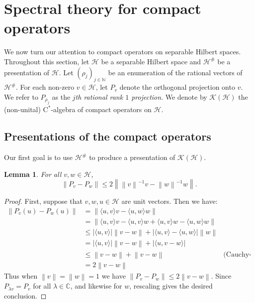 \documentclass{amsart}
\newcommand{\norm}[1]{\left\| #1 \right\|}
\newcommand{\abs}[1]{\left\vert #1 \right\vert}
\newcommand{\cstar}{$\mathrm{C}^*$}
\theoremstyle{plain}
\newtheorem{lemma}[theorem]{Lemma}
\theoremstyle{definition}
\numberwithin{equation}{section}
\begin{document}
\section{Spectral theory for compact operators}\label{section:CompactOperators}
We now turn our attention to compact operators on separable Hilbert spaces.  Throughout this section, let $\mathcal{H}$ be a separable Hilbert space and $\mathcal{H}^\#$ be a presentation of $\mathcal{H}$.  Let $(\rho_j)_{j \in \mathbb{N}}$ be an enumeration of the rational vectors of $\mathcal{H}^\#$.  For each non-zero $v \in \mathcal{H}$, let $P_v$ denote the orthogonal projection onto $v$.  We refer to $P_{\rho_j}$ as the \emph{$j$th rational rank $1$ projection}.  We denote by $\mathcal{K}(\mathcal{H})$ the (non-unital) \cstar-algebra of compact operators on $\mathcal{H}$.

\subsection{Presentations of the compact operators}
Our first goal is to use $\mathcal{H}^\#$ to produce a presentation of $\mathcal{K}(\mathcal{H})$.

\begin{lemma}\label{lem:ProjectionNorm}
For all $v, w \in \mathcal{H}$,
\[\norm{P_v - P_w} \leq 2\norm{\norm{v}^{-1}v - \norm{w}^{-1}w}.\]
\end{lemma}
\begin{proof}
First, suppose that $v, w, u \in \mathcal{H}$ are unit vectors.  Then we have:
\begin{align*}
\norm{P_v(u) - P_w(u)} &= \norm{\langle u,v \rangle v - \langle u, w \rangle w} \\
&= \norm{\langle u, v \rangle v - \langle u, v \rangle w + \langle u, v \rangle w - \langle u, w \rangle w} \\
&\leq \abs{\langle u, v \rangle}\norm{v-w} + \abs{\langle u,v \rangle - \langle u, w \rangle}\norm{w} \\
&= \abs{\langle u, v\rangle}\norm{v-w} + \abs{\langle u, v-w \rangle} \\
&\leq \norm{v-w} + \norm{v-w} &\text{(Cauchy-Schwartz)}\\
&= 2\norm{v-w}
\end{align*}
Thus when $\norm{v} = \norm{w} = 1$ we have $\norm{P_v - P_w} \leq 2\norm{v-w}$.  Since $P_{\lambda v} = P_v$ for all $\lambda \in \mathbb{C}$, and likewise for $w$, rescaling gives the desired conclusion.
\end{proof}
\end{document}
